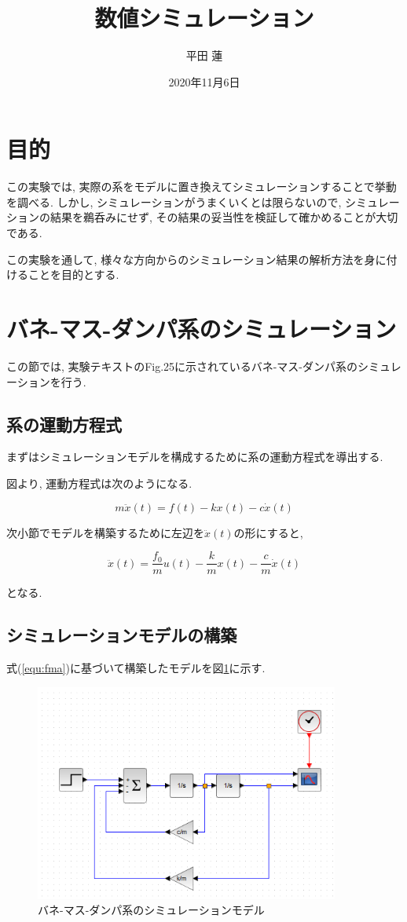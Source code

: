 \documentclass[titlepage]{jsarticle}
\title{数値シミュレーション}
\author{平田 蓮}
\date{2020年11月6日}
\begin{document}
\maketitle
\section{目的}
    この実験では, 実際の系をモデルに置き換えてシミュレーションすることで挙動を調べる.
    しかし, シミュレーションがうまくいくとは限らないので,
    シミュレーションの結果を鵜呑みにせず,
    その結果の妥当性を検証して確かめることが大切である.

    この実験を通して, 様々な方向からのシミュレーション結果の解析方法を身に付けることを目的とする.

\section{バネ-マス-ダンパ系のシミュレーション}
    この節では, 実験テキスト\cite{text}のFig.25に示されているバネ-マス-ダンパ系のシミュレーションを行う.
    \subsection{系の運動方程式}
        まずはシミュレーションモデルを構成するために系の運動方程式を導出する.

        図より, 運動方程式は次のようになる.

        \[
            m \ddot{x}(t) = f(t) -kx(t) - c \dot{x}(t)
        \]

        次小節でモデルを構築するために左辺を$\ddot{x}(t)$の形にすると,

        \begin{equation}
            \ddot{x}(t) = \frac{f_0}{m} u(t) -\frac{k}{m}x(t) - \frac{c}{m} \dot{x}(t) \label{equ:fma}
        \end{equation}

        となる.

    \subsection{シミュレーションモデルの構築}
        式(\ref{equ:fma})に基づいて構築したモデルを図\ref{fig:bmdsim}に示す.

        \begin{figure}[h]
            \centering
            \includegraphics[width=10cm]{img/BMDsim.png}
            \caption{バネ-マス-ダンパ系のシミュレーションモデル}
            \label{fig:bmdsim}
        \end{figure}
\end{document}
